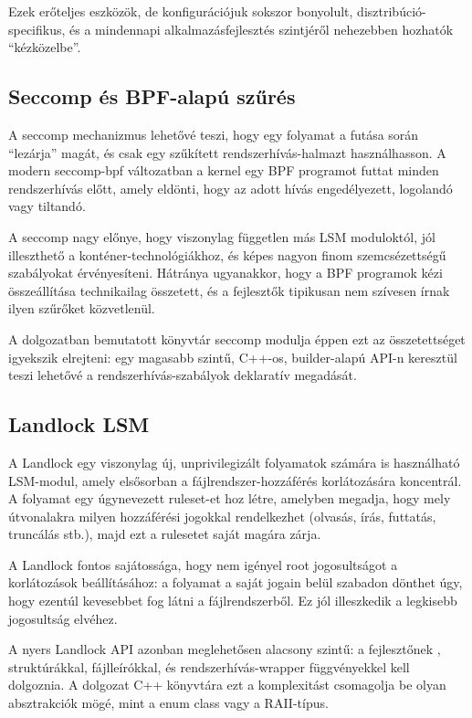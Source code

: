 Ezek erőteljes eszközök, de konfigurációjuk sokszor bonyolult, disztribúció-
specifikus, és a mindennapi alkalmazásfejlesztés szintjéről nehezebben
hozhatók ``kézközelbe''.


\subsection{Seccomp és BPF-alapú szűrés}

A seccomp mechanizmus lehetővé teszi, hogy egy folyamat a futása
során ``lezárja'' magát, és csak egy szűkített rendszerhívás-halmazt használhasson.
A modern seccomp-bpf változatban a kernel egy BPF programot futtat
minden rendszerhívás előtt, amely eldönti, hogy az adott hívás engedélyezett,
logolandó vagy tiltandó.

A seccomp nagy előnye, hogy viszonylag független más LSM moduloktól, jól
illeszthető a konténer-technológiákhoz, és képes nagyon finom szemcsézettségű
szabályokat érvényesíteni. Hátránya ugyanakkor, hogy a BPF programok kézi
összeállítása technikailag összetett, és a fejlesztők tipikusan nem szívesen
írnak ilyen szűrőket közvetlenül.

A dolgozatban bemutatott könyvtár seccomp modulja éppen ezt az
összetettséget igyekszik elrejteni: egy magasabb szintű, C++-os, builder-alapú
API-n keresztül teszi lehetővé a rendszerhívás-szabályok deklaratív
megadását.


\subsection{Landlock LSM}

A Landlock egy viszonylag új, unprivilegizált folyamatok számára is
használható LSM-modul, amely elsősorban a fájlrendszer-hozzáférés
korlátozására koncentrál. A folyamat egy úgynevezett ruleset-et hoz
létre, amelyben megadja, hogy mely útvonalakra milyen hozzáférési jogokkal
rendelkezhet (olvasás, írás, futtatás, truncálás stb.), majd ezt a rulesetet
saját magára zárja.

A Landlock fontos sajátossága, hogy nem igényel root jogosultságot a
korlátozások beállításához: a folyamat a saját jogain belül szabadon
dönthet úgy, hogy ezentúl kevesebbet fog látni a fájlrendszerből. Ez jól illeszkedik
a legkisebb jogosultság elvéhez.

A nyers Landlock API azonban meglehetősen alacsony szintű: a fejlesztőnek
, 
struktúrákkal, fájlleírókkal, és rendszerhívás-wrapper függvényekkel kell
dolgoznia. A dolgozat C++ könyvtára ezt a komplexitást csomagolja be olyan
absztrakciók mögé, mint a  enum class vagy a
 RAII-típus.



